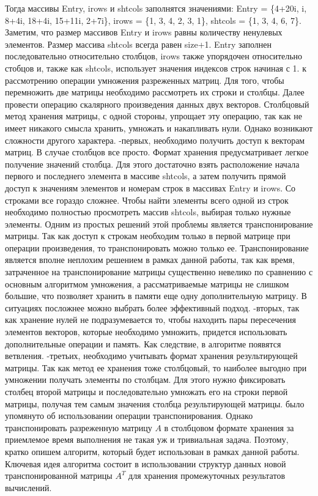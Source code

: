 \documentclass[12pt]{report}
\begin{document}
Тогда массивы Entry, irows и shtcols заполнятся значениями: Entry = \{4+20i, i, 8+4i, 18+4i, 15+11i, 2+7i\}, irows = \{1, 3, 4, 2, 3, 1\}, shtcols = \{1, 3, 4, 6, 7\}. Заметим, что размер массивов Entry и irows равны количеству ненулевых элементов. Размер массива shtcols всегда равен size+1. Entry заполнен последовательно относительно столбцов, irows также упорядочен относительно стобцов и, также как shtcols, использует значения индексов строк начиная с 1.
 к рассмотрению операции умножения разреженных матриц. Для того, чтобы перемножить две матрицы необходимо рассмотреть их строки и столбцы. Далее провести операцию скалярного произведения данных двух векторов. Столбцовый метод хранения матрицы, с одной стороны, упрощает эту операцию, так как не имеет никакого смысла хранить, умножать и накапливать нули. Однако возникают сложности другого характера.
-первых, необходимо получить доступ к векторам матриц. В случае столбцов все просто. Формат хранения предусматривает легкое получение значений столбца. Для этого достаточно взять расположение начала первого и последнего элемента в массиве shtcols, а затем получить прямой доступ к значениям элементов и номерам строк в массивах Entry и irows. Со строками все гораздо сложнее. Чтобы найти элементы всего одной из строк необходимо полностью просмотреть массив shtcols, выбирая только нужные элементы. Одним из простых решений этой проблемы является транспонирование матрицы. Так как доступ к строкам необходим только в первой матрице при операции произведения, то транспонировать можно только ее. Транспонирование является вполне неплохим решением в рамках данной работы, так как время, затраченное на транспонирование матрицы существенно невелико по сравнению с основным алгоритмом умножения, а рассматриваемые матрицы не слишком большие, что позволяет хранить в памяти еще одну дополнительную матрицу. В ситуациях посложнее можно выбрать более эффективный подход.
-вторых, так как хранение нулей не подразумевается то, чтобы находить пары пересечения элементов векторов, которые необходимо умножить, придется использовать дополнительные операции и память. Как следствие, в алгоритме появятся ветвления.
-третьих, необходимо учитывать формат хранения результирующей матрицы. Так как метод ее хранения тоже столбцовый, то наиболее выгодно при умножении получать элементы по столбцам. Для этого нужно фиксировать столбец второй матрицы и последовательно умножать его на строки первой матрицы, получая тем самым значения столбца результирующей матрицы.
 было упомянуто об использовании операции транспонирования. Однако транспонировать разреженную матрицу $A$ в столбцовом формате хранения за приемлемое время выполнения не такая уж и тривиальная задача. Поэтому, кратко опишем алгоритм, который будет использован в рамках данной работы. Ключевая идея алгоритма состоит в использовании структур данных новой транспонированной матрицы $A^T$ для хранения промежуточных результатов вычислений.
\end{document}
